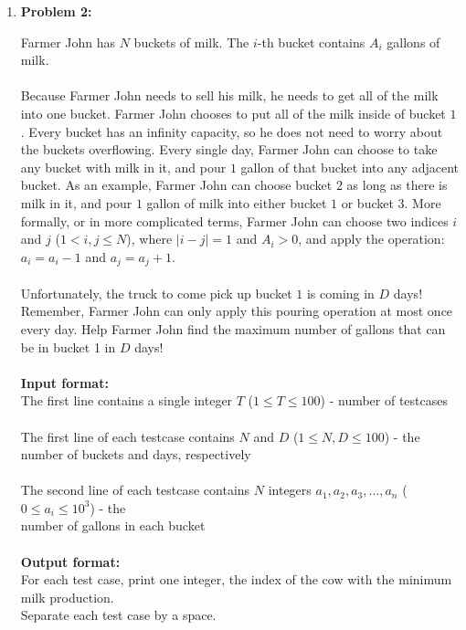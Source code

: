 \documentclass[11pt]{article}
\begin{document}
\begin{enumerate}

\item
\textbf{Problem 2:}

Farmer John has $N$ buckets of milk. The $i$-th bucket contains $A_i$ gallons of milk.\\\\
Because Farmer John needs to sell his milk, he needs to get all of the milk into one bucket. Farmer John chooses to put all of the milk inside of bucket $1$. Every bucket has an infinity capacity, so he does not need to worry about the buckets overflowing. Every single day, Farmer John can choose to take any bucket with milk in it, and pour $1$ gallon of that bucket into any adjacent bucket. As an example, Farmer John can choose bucket 2 as long as there is milk in it, and pour $1$ gallon of milk into either bucket $1$ or bucket $3$. More formally, or in more complicated terms, Farmer John can choose two indices $i$ and $j$ ($1 < i, j \leq N$), where $|i - j| = 1$ and $A_i > 0$, and apply the operation: $a_i = a_i - 1$ and $a_j = a_j + 1$. \\\\
Unfortunately, the truck to come pick up bucket $1$ is coming in $D$ days! Remember, Farmer John can only apply this pouring operation at most once every day. Help Farmer John find the maximum number of gallons that can be in bucket 1 in $D$ days!
\\
\\
\textbf{Input format:}\\
The first line contains a single integer $T$ ($1 \leq T \leq 100$) - number of testcases\\\\
The first line of each testcase contains $N$ and $D$ ($1 \leq N, D \leq 100$) - the number of buckets and days, respectively\\\\
The second line of each testcase contains $N$ integers $a_1, a_2, a_3, ..., a_n$ ($0 \leq a_i \leq 10^3$) - the \\number of gallons in each bucket
\\\\
\textbf{Output format:}\\
For each test case, print one integer, the index of the cow with the minimum milk production. \\Separate each test case by a space.\\


\end{enumerate}
\end{document}
